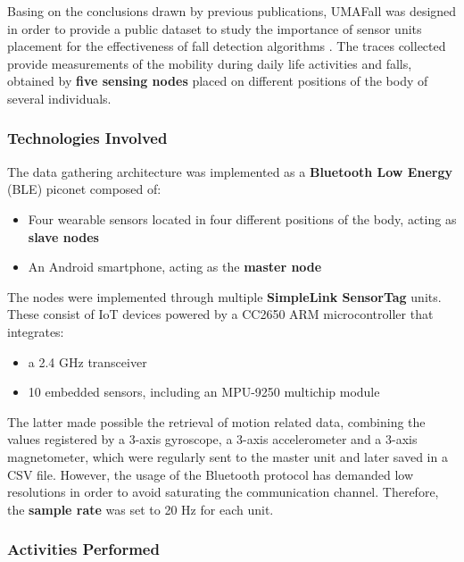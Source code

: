 Basing on the conclusions drawn by previous publications, UMAFall was designed in order to provide a public dataset to study the importance of sensor units placement for the effectiveness of fall detection algorithms \cite{umafall}. The traces collected provide measurements of the mobility during daily life activities and falls, obtained by \textbf{five sensing nodes} placed on different positions of the body of several individuals.

\subsubsection{Technologies Involved}\label{subsubsec:umafall-technologies}

The data gathering architecture was implemented as a \textbf{Bluetooth Low Energy} (BLE) piconet composed of:

\begin{itemize}
    \item Four wearable sensors located in four different positions of the body, acting as \textbf{slave nodes}
    \item An Android smartphone, acting as the \textbf{master node}
\end{itemize}

The nodes were implemented through multiple \textbf{SimpleLink SensorTag} units. These consist of IoT devices powered by a CC2650 ARM microcontroller that integrates: 

\begin{itemize}
    \item a 2.4 GHz transceiver
    \item 10 embedded sensors, including an MPU-9250 multichip module
\end{itemize}

The latter made possible the retrieval of motion related data, combining the values registered by a 3-axis gyroscope, a 3-axis accelerometer and a 3-axis magnetometer, which were regularly sent to the master unit and later saved in a CSV file. However, the usage of the Bluetooth protocol has demanded low resolutions in order to avoid saturating the communication channel. Therefore, the \textbf{sample rate} was set to 20 Hz for each unit.

\subsubsection{Activities Performed}\label{subsubsec:umafall-activities}

